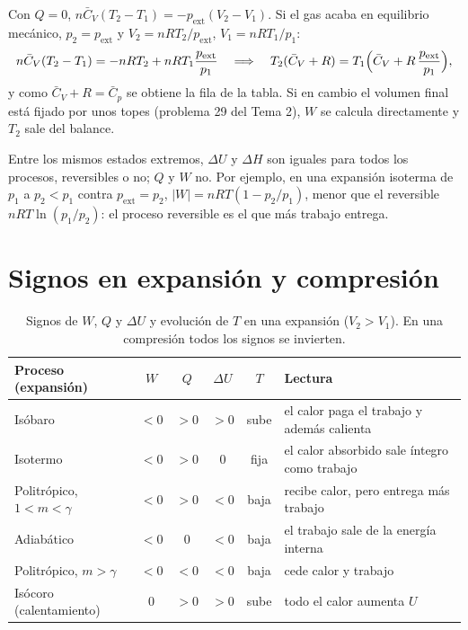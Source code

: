 \documentclass[11pt,a4paper]{article}
\newcommand{\Cv}{\bar C_V}
\newcommand{\Cp}{\bar C_p}
\begin{document}
 Con $Q=0$, $n\Cv(T_2-T_1)=-p_{\mathrm{ext}}(V_2-V_1)$. Si el gas
acaba en equilibrio mecánico, $p_2=p_{\mathrm{ext}}$ y $V_2=nRT_2/p_{\mathrm{ext}}$, $V_1=nRT_1/p_1$:
\[
  n\Cv(T_2-T_1)=-nRT_2+nRT_1\frac{p_{\mathrm{ext}}}{p_1}
  \quad\Longrightarrow\quad
  T_2(\Cv+R)=T_1\Bigl(\Cv+R\,\frac{p_{\mathrm{ext}}}{p_1}\Bigr),
\]
y como $\Cv+R=\Cp$ se obtiene la fila de la tabla. Si en cambio el volumen final está fijado por unos
topes (problema 29 del Tema 2), $W$ se calcula directamente y $T_2$ sale del balance.

\begin{observacion}
Entre los mismos estados extremos, $\Delta U$ y $\Delta H$ son iguales para todos los procesos, reversibles o
no; $Q$ y $W$ no. Por ejemplo, en una expansión isoterma de $p_1$ a $p_2<p_1$ contra $p_{\mathrm{ext}}=p_2$,
$|W|=nRT(1-p_2/p_1)$, menor que el reversible $nRT\ln(p_1/p_2)$: el proceso reversible es el que más
trabajo entrega.
\end{observacion}

\section{Signos en expansión y compresión}

\begin{table}[htbp]
\centering
\caption{Signos de $W$, $Q$ y $\Delta U$ y evolución de $T$ en una expansión ($V_2>V_1$). En una compresión todos
los signos se invierten.}
\label{tab:signos}
\small
\renewcommand{\arraystretch}{1.45}
\begin{tabular}{lccccl}
\toprule
Proceso (expansión) & $W$ & $Q$ & $\Delta U$ & $T$ & Lectura\\
\midrule
Isóbaro & $<0$ & $>0$ & $>0$ & sube & el calor paga el trabajo y además calienta\\
Isotermo & $<0$ & $>0$ & $0$ & fija & el calor absorbido sale íntegro como trabajo\\
Politrópico, $1<m<\gamma$ & $<0$ & $>0$ & $<0$ & baja & recibe calor, pero entrega más trabajo\\
Adiabático & $<0$ & $0$ & $<0$ & baja & el trabajo sale de la energía interna\\
Politrópico, $m>\gamma$ & $<0$ & $<0$ & $<0$ & baja & cede calor y trabajo\\
\midrule
Isócoro (calentamiento) & $0$ & $>0$ & $>0$ & sube & todo el calor aumenta $U$\\
\bottomrule
\end{tabular}
\end{table}
\end{document}
